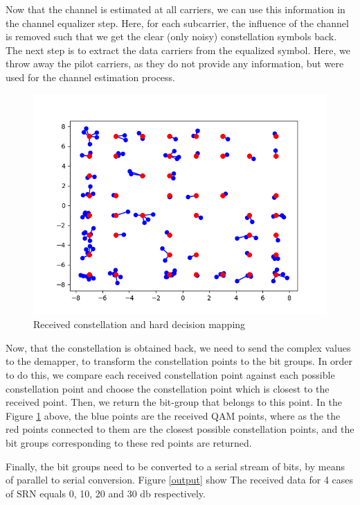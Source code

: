 Now that the channel is estimated at all carriers, we can use this information in the channel equalizer step. Here, for each subcarrier, the influence of the channel is removed such that we get the clear (only noisy) constellation symbols back. The next step is to extract the data carriers from the equalized symbol. Here, we throw away the pilot carriers, as they do not provide any information, but were used for the channel estimation process.

\begin{figure}[htbp]
    \centering
    \includegraphics[width=\linewidth]{../Source/results/received_constellation.png}
    \caption{Received constellation and hard decision mapping}
    \label{received}
\end{figure}

Now, that the constellation is obtained back, we need to send the complex values to the demapper, to transform the constellation points to the bit groups. In order to do this, we compare each received constellation point against each possible constellation point and choose the constellation point which is closest to the received point. Then, we return the bit-group that belongs to this point. In the Figure \ref{received} above, the blue points are the received QAM points, where as the the red points connected to them are the closest possible constellation points, and the bit groups corresponding to these red points are returned.

Finally, the bit groups need to be converted to a serial stream of bits, by means of parallel to serial conversion. Figure \ref{output} show The received data for 4 cases of SRN equals 0, 10, 20 and 30 db respectively.

